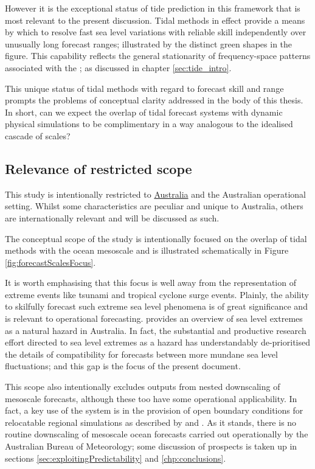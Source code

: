 However it is the exceptional status of tide prediction in this framework that is most relevant to the present discussion.  Tidal methods in effect provide a means by which to resolve fast sea level variations with reliable skill independently over unusually long forecast ranges; illustrated by the distinct green shapes in the figure.    This capability reflects the general stationarity of frequency-space patterns associated with the \ATGP{}; as discussed in chapter \ref{sec:tide_intro}.

This unique status of tidal methods with regard to forecast skill and range prompts the problems of conceptual clarity addressed in the body of this thesis.  In short, can we expect the overlap of tidal forecast systems with dynamic physical simulations to be complimentary in a way analogous to the idealised cascade of scales?
\subsection{Relevance of restricted scope}
This study is intentionally restricted to \underline{Australia} and the Australian operational setting.  Whilst some characteristics are peculiar and unique to Australia, others are internationally relevant and will be discussed as such.


The conceptual scope of the study is intentionally focused on the overlap of tidal methods with the ocean mesoscale and is illustrated schematically in Figure \ref{fig:forecastScalesFocus}.


It is worth emphasising that this focus is well away from the representation of extreme events like tsunami and tropical cyclone surge events.   Plainly, the ability to skilfully forecast such extreme sea level phenomena is of great significance and is relevant to operational forecasting. \citet{McInnes:2016km} provides an overview of sea level extremes as a natural hazard in Australia.    
In fact, the substantial and productive research effort directed to sea level extremes as a hazard has understandably de-prioritised the details of compatibility for forecasts between more mundane sea level fluctuations; and this gap is the focus of the present document. 

This scope also intentionally excludes outputs from nested downscaling of mesoscale forecasts, although these too have some operational applicability.   In fact, a key use of the  \BL{} system is in the provision of open boundary conditions for relocatable regional simulations as described by \citep{10.1080/1755876x.2019.1685834} and \citep{10.1007/978-3-319-15994-2_23}.  As it stands, there is no routine downscaling of mesoscale ocean forecasts carried out operationally by the Australian Bureau of Meteorology; some discussion of prospects is taken up in sections \ref{sec:exploitingPredictability} and  \ref{chp:conclusions}. 

